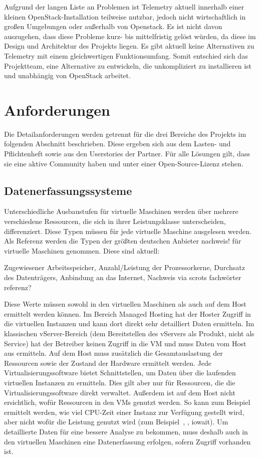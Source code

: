 Aufgrund der langen Liste an Problemen ist Telemetry aktuell innerhalb einer
kleinen OpenStack-Installation teilweise nutzbar, jedoch nicht wirtschaftlich
in großen Umgebungen oder außerhalb von Openstack. Es ist nicht davon
auszugehen, dass diese Probleme kurz- bis mittelfristig gelöst würden, da diese
im Design und Architektur des Projekts liegen. Es gibt aktuell keine
Alternativen zu Telemetry mit einem gleichwertigen Funktionsumfang. Somit
entschied sich das Projektteam, eine Alternative zu entwickeln, die
unkompliziert zu installieren ist und unabhängig von OpenStack arbeitet.
\tm%

\section{Anforderungen}
Die Detailanforderungen werden getrennt für die drei Bereiche des Projekts im
folgenden Abschnitt beschrieben. Diese ergeben sich aus dem Lasten- und
Pflichtenheft sowie aus den Userstories der Partner. Für alle Lösungen gilt,
dass sie eine aktive Community haben und unter einer Open-Source-Lizenz stehen.
\tm%

\subsection{Datenerfassungssysteme}
\label{section:datenerfassungssysteme}
Unterschiedliche Ausbaustufen für virtuelle Maschinen werden über mehrere
verschiedene Ressourcen, die sich in ihrer Leistungsklasse unterscheiden,
differenziert. Diese Typen müssen für jede virtuelle Maschine ausgelesen werden.
Als Referenz werden die Typen der größten deutschen Anbieter nachweis! für
virtuelle Maschinen genommen. Diese sind aktuell:

Zugewiesener Arbeitsspeicher, Anzahl/Leistung der Prozessorkerne, Durchsatz des
Datenträgers, Anbindung an das Internet, Nachweis via scrots fachwörter
referenz?

Diese Werte müssen sowohl in den virtuellen Maschinen als auch auf dem Host
ermittelt werden können. Im Bereich Managed Hosting hat der Hoster Zugriff in
die virtuellen Instanzen und kann dort direkt sehr detailliert Daten ermitteln.
Im klassischen vServer-Bereich (dem Bereitstellen des vServers als Produkt,
nicht als Service) hat der Betreiber keinen Zugriff in die VM und muss Daten
vom Host aus ermitteln. Auf dem Host muss zusätzlich die Gesamtauslastung der
Ressourcen sowie der Zustand der Hardware ermittelt werden. Jede
Virtualisierungssoftware bietet Schnittstellen, um Daten über die laufenden
virtuellen Instanzen zu ermitteln. Dies gilt aber nur für Ressourcen, die die
Virtualisierungssoftware direkt verwaltet. Außerdem ist auf dem Host nicht
ersichtlich, wofür Ressourcen in den VMs genutzt werden. So kann zum Beispiel
ermittelt werden, wie viel CPU-Zeit einer Instanz zur Verfügung gestellt wird,
aber nicht wofür die Leistung genutzt wird (zum
Beispiel~, ,
\gls{iowait}). Um detaillierte Daten für eine bessere Analyse zu bekommen, muss
deshalb auch in den virtuellen Maschinen eine Datenerfassung erfolgen, sofern
Zugriff vorhanden ist.

